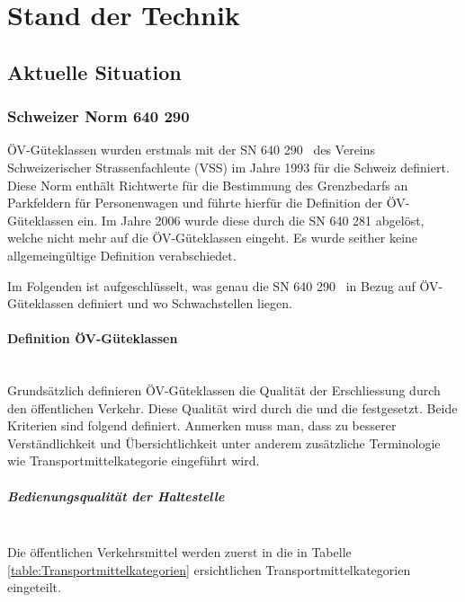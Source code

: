 
\section{Stand der Technik}
\label{Stand der Technik}

\subsection{Aktuelle Situation}
\label{Stand der Technik:Aktuelle Situation}

\subsubsection{Schweizer Norm 640 290}
\label{Aktuelle Situation:Schweizer Norm 640 290}

\acs{ÖV}-Güteklassen wurden erstmals mit der \ac{SN} 640 290~\cite{sn640290} des Vereins Schweizerischer Strassenfachleute (VSS) im Jahre 1993 für die Schweiz definiert.
Diese Norm enthält Richtwerte für die Bestimmung des Grenzbedarfs an Parkfeldern für Personenwagen und führte hierfür die Definition der \acs{ÖV}-Güteklassen ein.
Im Jahre 2006 wurde diese durch die \acs{SN} 640 281 abgelöst, welche nicht mehr auf die \acs{ÖV}-Güteklassen eingeht.
Es wurde seither keine allgemeingültige Definition verabschiedet.

Im Folgenden ist aufgeschlüsselt, was genau die \acs{SN} 640 290~\cite{sn640290} in Bezug auf \acs{ÖV}-Güteklassen definiert und wo Schwachstellen liegen.

\paragraph{Definition ÖV-Güteklassen}~\\
\label{Schweizer Norm 640 290:Definition ÖV-Güteklassen}
Grundsätzlich definieren \acs{ÖV}-Güteklassen die Qualität der Erschliessung durch den öffentlichen Verkehr.
Diese Qualität wird durch die  und die  festgesetzt.
Beide Kriterien sind folgend definiert.
Anmerken muss man, dass zu besserer Verständlichkeit und Übersichtlichkeit unter anderem zusätzliche Terminologie wie Transportmittelkategorie eingeführt wird.

\subparagraph{Bedienungsqualität der Haltestelle}~\\
\label{Definition ÖV-Güteklassen:Bedienungsqualität der Haltestelle}
Die öffentlichen Verkehrsmittel werden zuerst in die in Tabelle \ref{table:Transportmittelkategorien} ersichtlichen Transportmittelkategorien eingeteilt.

